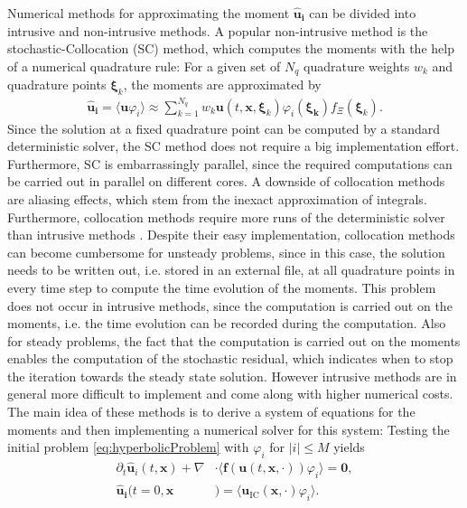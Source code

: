 Numerical methods for approximating the moment $\bm{\hat u_i}$ can be divided into intrusive and non-intrusive methods. A popular non-intrusive method is the stochastic-Collocation (SC) method, which computes the moments with the help of a numerical quadrature rule: For a given set of $N_q$ quadrature weights $w_k$ and quadrature points $\bm{\xi}_k$, the moments are approximated by
\begin{align*}
\bm{\hat u_i} = \langle \bm{u}\varphi_i \rangle \approx \sum_{k = 1}^{N_q}w_k \bm{u}({t,\bm{x},\bm{\xi}_k})\varphi_i(\bm{\xi_k})f_{\Xi}(\bm{\xi}_k).
\end{align*} 
Since the solution at a fixed quadrature point can be computed by a standard deterministic solver, the SC method does not require a big implementation effort. Furthermore, SC is embarrassingly parallel, since the required computations can be carried out in parallel on different cores. A downside of collocation methods are aliasing effects, which stem from the inexact approximation of integrals. Furthermore, collocation methods require more runs of the deterministic solver than intrusive methods \cite{xiu2009fast,alekseev2011estimation}. Despite their easy implementation, collocation methods can become cumbersome for unsteady problems, since in this case, the solution needs to be written out, i.e. stored in an external file, at all quadrature points in every time step to compute the time evolution of the moments.
This problem does not occur in intrusive methods, since the computation is carried out on the moments, i.e. the time evolution can be recorded during the computation. Also for steady problems, the fact that the computation is carried out on the moments enables the computation of the stochastic residual, which indicates when to stop the iteration towards the steady state solution. However intrusive methods are in general more difficult to implement and come along with higher numerical costs. The main idea of these methods is to derive a system of equations for the moments and then implementing a numerical solver for this system: Testing the initial problem \eqref{eq:hyperbolicProblem} with $\varphi_i$ for $|i|\leq M$ yields
\begin{subequations}\label{eq:nonClosedMomentSystem}
\begin{align}
\partial_t \bm{\hat u}_i(t,\bm{x}) + \nabla&\cdot\langle\bm{f}(\bm{u}(t,\bm{x},\cdot)) \varphi_i\rangle = \bm{0}, \\
\bm{\hat u_i}(t=0,\bm{x}&) = \langle\bm{u}_{\text{IC}}(\bm{x},\cdot)\varphi_i\rangle.
\end{align}
\end{subequations}
